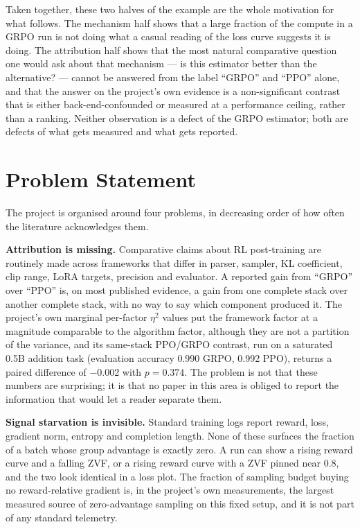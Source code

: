 \documentclass[12pt,a4paper]{report}
\begin{document}
Taken together, these two halves of the example are the whole motivation
for what follows. The mechanism half shows that a large fraction of the
compute in a GRPO run is not doing what a casual reading of the loss
curve suggests it is doing. The attribution half shows that the most
natural comparative question one would ask about that mechanism --- is
this estimator better than the alternative? --- cannot be answered from
the label ``GRPO'' and ``PPO'' alone, and that the answer on the
project's own evidence is a non-significant contrast that is either
back-end-confounded or measured at a performance ceiling, rather than a
ranking. Neither observation is a defect of the GRPO estimator; both are
defects of what gets measured and what gets reported.

\section{Problem Statement}\label{problem-statement}

The project is organised around four problems, in decreasing order of
how often the literature acknowledges them.

\textbf{Attribution is missing.} Comparative claims about RL
post-training are routinely made across frameworks that differ in
parser, sampler, KL coefficient, clip range, LoRA targets, precision and
evaluator. A reported gain from ``GRPO'' over ``PPO'' is, on most
published evidence, a gain from one complete stack over another complete
stack, with no way to say which component produced it. The project's own
marginal per-factor \(\eta^2\) values put the framework factor at a
magnitude comparable to the algorithm factor, although they are not a
partition of the variance, and its same-stack PPO/GRPO contrast, run on
a saturated 0.5B addition task (evaluation accuracy 0.990 GRPO, 0.992
PPO), returns a paired difference of −0.002 with \(p = 0.374\). The
problem is not that these numbers are surprising; it is that no paper in
this area is obliged to report the information that would let a reader
separate them.

\textbf{Signal starvation is invisible.} Standard training logs report
reward, loss, gradient norm, entropy and completion length. None of
these surfaces the fraction of a batch whose group advantage is exactly
zero. A run can show a rising reward curve and a falling ZVF, or a
rising reward curve with a ZVF pinned near 0.8, and the two look
identical in a loss plot. The fraction of sampling budget buying no
reward-relative gradient is, in the project's own measurements, the
largest measured source of zero-advantage sampling on this fixed setup,
and it is not part of any standard telemetry.
\end{document}
